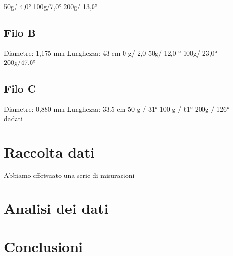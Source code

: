 \documentclass[a4paper,10pt]{report}
\begin{document}
50g/ 4,0°
100g/7,0°
200g/ 13,0°

\subsection{Filo B}
Diametro: 1,175 mm
Lunghezza: 43 cm
0 g/ 2,0
50g/ 12,0 °
100g/ 23,0°
200g/47,0°
\subsection{Filo C}
Diametro: 0,880 mm
Lunghezza: 33,5 cm
50 g / 31°
100 g / 61°
200g / 126°
dadati


\section{Raccolta dati}
Abbiamo effettuato una serie di misurazioni 
\section{Analisi dei dati}
\section{Conclusioni}
\end{document}
